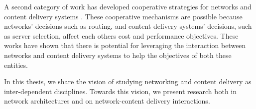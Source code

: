 A second category of work has developed cooperative strategies for networks and content delivery systems \cite{P4P, JohariGameTheory, CATE}. These cooperative mechanisms are possible because networks' decisions such as routing, and content delivery systems' decisions, such as server selection, affect each others cost and performance objectives. These works have shown that there is potential for leveraging the interaction between networks and content delivery systems to help the objectives of both these entities. 





In this thesis, we share the vision of studying networking and content delivery as inter-dependent disciplines. Towards this vision, we present research both in network architectures and on network-content delivery interactions. 

